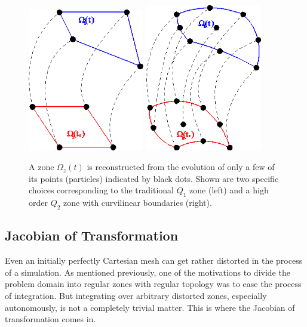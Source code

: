\begin{figure}[h!]
 \centering
   \centerline{
    \mbox{\includegraphics[width=2.00in]{./Figures/motion1.png}}
    \mbox{\hspace*{0.5in}}
    \mbox{\includegraphics[width=2.00in]{./Figures/motion2.png}}
  }
 \caption{A zone $\Omega_z(t)$ is reconstructed from the evolution of only a few of its points (particles) indicated by black dots. Shown are two specific choices corresponding to the traditional $Q_1$ zone (left) and a high order $Q_2$ zone with curvilinear boundaries (right).}
 \label{fig:MeshMotion}
\end{figure}

\subsection{Jacobian of Transformation}\label{sec:JacobianTransformation}
Even an initially perfectly Cartesian mesh can get rather distorted in the process of a simulation. As mentioned previously, one of the motivations to divide the problem domain into regular zones with regular topology was to ease the process of integration. But integrating over arbitrary distorted zones, especially autonomously, is not a completely trivial matter. This is where the Jacobian of transformation comes in. 

